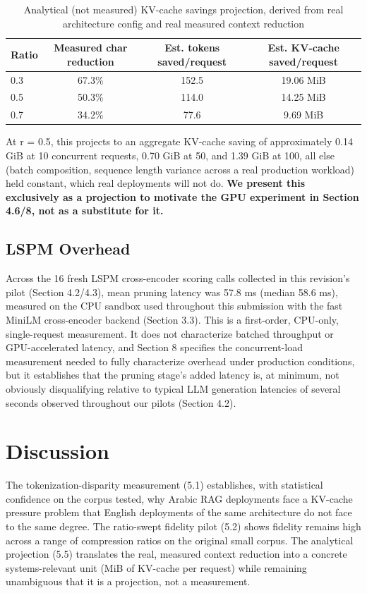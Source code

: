 \documentclass[pdflatex,sn-basic,Numbered]{sn-jnl}
\begin{document}
\begin{table}[htbp]
\caption{Analytical (not measured) KV-cache savings projection, derived from real architecture config and real measured context reduction}
\label{tab:6}
\centering
\footnotesize
\setlength{\tabcolsep}{3.5pt}
\begin{tabular}{lccc}
\toprule
Ratio & Measured char reduction & Est. tokens saved/request & Est. KV-cache saved/request \\
\midrule
0.3 & 67.3\% & 152.5 & 19.06 MiB \\
0.5 & 50.3\% & 114.0 & 14.25 MiB \\
0.7 & 34.2\% & 77.6 & 9.69 MiB \\
\bottomrule
\end{tabular}
\end{table}
At r = 0.5, this projects to an aggregate KV-cache saving of approximately 0.14 GiB at 10 concurrent requests, 0.70 GiB at 50, and 1.39 GiB at 100, all else (batch composition, sequence length variance across a real production workload) held constant, which real deployments will not do. \textbf{We present this exclusively as a projection to motivate the GPU experiment in Section 4.6/8, not as a substitute for it.}

\subsection{LSPM Overhead}
Across the 16 fresh LSPM cross-encoder scoring calls collected in this revision's pilot (Section 4.2/4.3), mean pruning latency was 57.8 ms (median 58.6 ms), measured on the CPU sandbox used throughout this submission with the fast MiniLM cross-encoder backend (Section 3.3). This is a first-order, CPU-only, single-request measurement. It does not characterize batched throughput or GPU-accelerated latency, and Section 8 specifies the concurrent-load measurement needed to fully characterize overhead under production conditions, but it establishes that the pruning stage's added latency is, at minimum, not obviously disqualifying relative to typical LLM generation latencies of several seconds observed throughout our pilots (Section 4.2).

\section{Discussion}
The tokenization-disparity measurement (5.1) establishes, with statistical confidence on the corpus tested, why Arabic RAG deployments face a KV-cache pressure problem that English deployments of the same architecture do not face to the same degree. The ratio-swept fidelity pilot (5.2) shows fidelity remains high across a range of compression ratios on the original small corpus. The analytical projection (5.5) translates the real, measured context reduction into a concrete systems-relevant unit (MiB of KV-cache per request) while remaining unambiguous that it is a projection, not a measurement.
\end{document}
